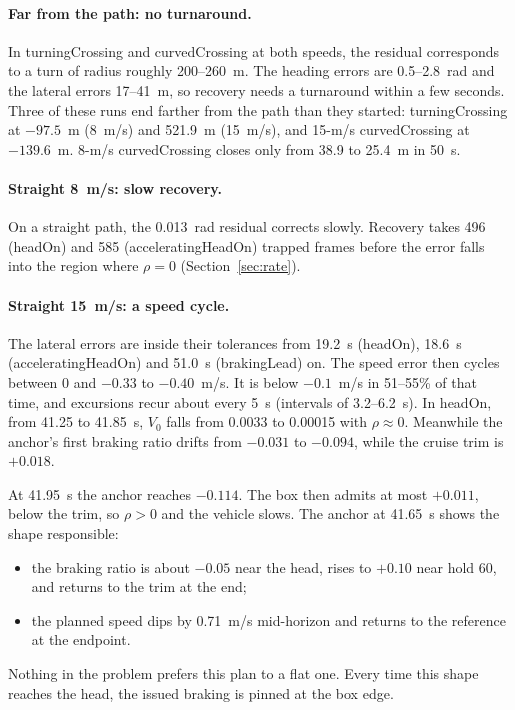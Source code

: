 \documentclass[11pt]{article}
\begin{document}
\paragraph{Far from the path: no turnaround.} In turningCrossing and
curvedCrossing at both speeds, the residual corresponds to a turn of radius
roughly 200--260~m. The heading errors are 0.5--2.8~rad and the lateral errors
17--41~m, so recovery needs a turnaround within a few seconds. Three of these
runs end farther from the path than they started: turningCrossing at
$-97.5$~m (8~m/s) and 521.9~m (15~m/s), and 15-m/s curvedCrossing at
$-139.6$~m. 8-m/s curvedCrossing closes only from 38.9 to 25.4~m in 50~s.

\paragraph{Straight 8~m/s: slow recovery.} On a straight path, the 0.013~rad
residual corrects slowly. Recovery takes 496 (headOn) and 585
(acceleratingHeadOn) trapped frames before the error falls into the region where
$\rho=0$ (Section~\ref{sec:rate}).

\paragraph{Straight 15~m/s: a speed cycle.} The lateral errors are inside their
tolerances from 19.2~s (headOn), 18.6~s (acceleratingHeadOn) and 51.0~s
(brakingLead) on. The speed error then cycles between 0 and $-0.33$ to
$-0.40$~m/s. It is below $-0.1$~m/s in 51--55\% of that time, and excursions
recur about every 5~s (intervals of 3.2--6.2~s). In headOn, from 41.25 to 41.85~s, $V_0$ falls from
0.0033 to 0.00015 with $\rho\approx0$. Meanwhile the anchor's first braking ratio
drifts from $-0.031$ to $-0.094$, while the cruise trim is $+0.018$.

At 41.95~s the anchor reaches $-0.114$. The box then admits at most $+0.011$,
below the trim, so $\rho>0$ and the vehicle slows. The anchor at 41.65~s shows
the shape responsible:
\begin{itemize}
\item the braking ratio is about $-0.05$ near the head, rises to $+0.10$ near
hold 60, and returns to the trim at the end;
\item the planned speed dips by 0.71~m/s mid-horizon and returns to the
reference at the endpoint.
\end{itemize}
Nothing in the problem prefers this plan to a flat one. Every time this shape
reaches the head, the issued braking is pinned at the box edge.
\end{document}
